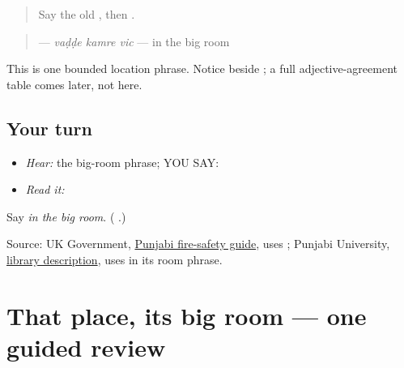 \label{lesson:PA-C180-vadde}



\begin{quote}
Say the old \textbf{}, then \textbf{ }.
\end{quote}

\begin{grammarlens}[title={Grammar Lens: one agreeing phrase}]
\begin{quote}
\textbf{  } — \emph{vaḍḍe kamre vic} — in the big room
\end{quote}

This is one bounded location phrase. Notice \textbf{} beside \textbf{}; a full adjective-agreement table comes later, not here.
\end{grammarlens}

\subsection*{Your turn}
\begin{itemize}
\raggedright
  \item \emph{Hear:} the big-room phrase; YOU SAY: \textbf{  }
  \item \emph{Read it:} \textbf{  }
\end{itemize}

\begin{tcolorbox}[breakable,colback=teal!4,colframe=teal!35!black,title={Before you move on}]
Say \emph{in the big room}. (\textbf{  }.)

Source: UK Government, \href{https://www.hantsfire.gov.uk/wp-content/uploads/2021/03/Punjabi-Fire-Safety-in-the-Home.pdf}{Punjabi fire-safety guide}, uses \textbf{  }; Punjabi University, \href{https://punjabiuniversity.ac.in/Pages/Department.aspx?dsenc=129}{library description}, uses \textbf{ } in its room phrase.
\end{tcolorbox}
\section[\texorpdfstring{\pa{ਉਸ} \pa{ਥਾਂ} \pa{ਦੇ} \pa{ਵੱਡੇ} \pa{ਕਮਰੇ} \pa{ਵਿੱਚ} (us thaan de …)}{ਉਸ ਥਾਂ ਦੇ ਵੱਡੇ ਕਮਰੇ ਵਿੱਚ (us thaan de …)}]{That place, its big room — one guided review}

\label{lesson:PA-C180-place-review}



